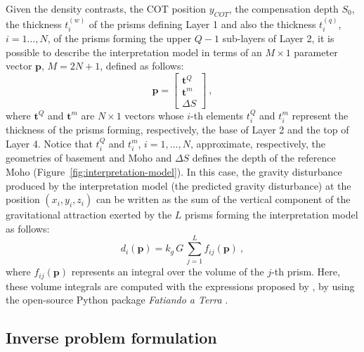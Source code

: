 \documentclass[manuscript]{geophysics}
\begin{document}
Given the density contrasts, the COT position $y_{COT}$, the compensation
depth $S_{0}$, the thickness $t^{(w)}_{i}$ of the prisms defining Layer 1 and 
also the thickness $t^{(q)}_{i}$, $i = 1 \dots, N$, of the prisms forming the 
upper $Q-1$ sub-layers of Layer 2, it is possible to describe the interpretation
model in terms of an $M \times 1$ parameter vector $\mathbf{p}$, $M = 2N + 1$, defined
as follows:
\begin{equation}
\mathbf{p} = \begin{bmatrix}
\mathbf{t}^{Q} \\
\mathbf{t}^{m} \\
\Delta S
\end{bmatrix} \: ,
\label{eq:parameter-vector}
\end{equation}
where $\mathbf{t}^{Q}$ and $\mathbf{t}^{m}$ are $N \times 1$ vectors whose $i$-th
elements $t^{Q}_{i}$ and $t^{m}_{i}$ represent the thickness of the
prisms forming, respectively, the base of Layer 2 and the top of Layer 4.
Notice that $t^{Q}_{i}$ and $t^{m}_{i}$, $i = 1, \dots, N$, approximate, respectively, the 
geometries of basement and Moho and $\Delta S$ defines the depth of the
reference Moho (Figure~\ref{fig:interpretation-model}).
In this case, the gravity disturbance produced by the interpretation model (the
predicted gravity disturbance) at the position $(x_{i}, y_{i}, z_{i})$ can be written
as the sum of the vertical component of the gravitational attraction exerted by the $L$
prisms forming the interpretation model as follows:
\begin{equation}
d_{i}(\mathbf{p}) = k_{g} \, G \, \sum_{j = 1}^{L} f_{ij}(\mathbf{p}) \: ,
\label{eq:ith-predicted-data}
\end{equation}
where $f_{ij}(\mathbf{p})$ represents an integral over the volume of the $j$-th 
prism. Here, these volume integrals are computed with the expressions proposed 
by \citet{nagy-etal2000}, by using the open-source Python package 
\textit{Fatiando a Terra} \citep{uieda-etal2013}.


\subsection{Inverse problem formulation}
\end{document}
